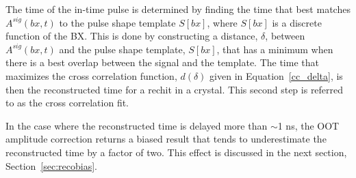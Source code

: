 The time of the in-time pulse is determined by finding the time that best matches $A^{sig}(bx,t)$ to the pulse shape template $S[bx]$, where $S[bx]$ is a discrete function of the BX. This is done by constructing a distance, $\delta$, between $A^{sig}(bx,t)$ and the pulse shape template, $S[bx]$, that has a minimum when there is a best overlap between the signal and the template. The time that maximizes the cross correlation function, $d(\delta)$ given in Equation~\ref{cc_delta}, is then the reconstructed time for a rechit in a crystal. This second step is referred to as the cross correlation fit.

In the case where the reconstructed time is delayed more than $\sim$1 ns, the OOT amplitude correction returns a biased result that tends to underestimate the reconstructed time by a factor of two. This effect is discussed in the next section, Section~\ref{sec:recobias}. 



